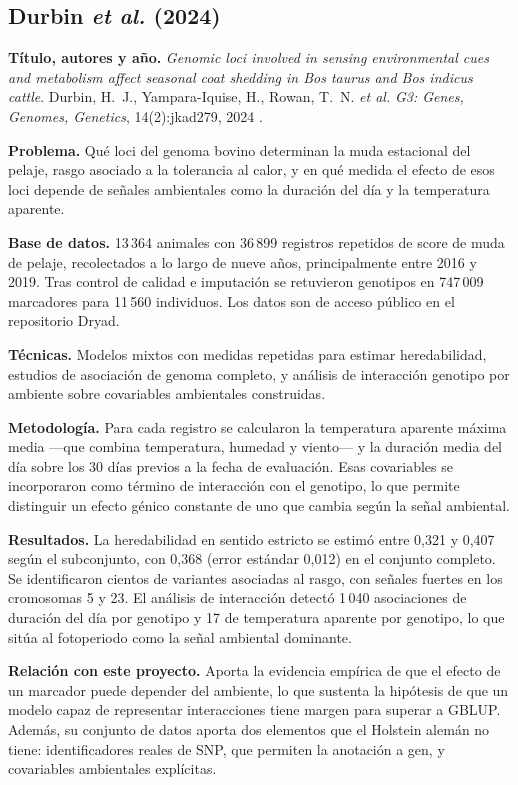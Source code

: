 \documentclass[conference]{IEEEtran}
\begin{document}
\subsection{Durbin \textit{et al.} (2024)}

\textbf{Título, autores y año.} \textit{Genomic loci involved in sensing
environmental cues and metabolism affect seasonal coat shedding in Bos
taurus and Bos indicus cattle}. Durbin, H.~J., Yampara-Iquise, H., Rowan,
T.~N. \textit{et al.} \textit{G3: Genes, Genomes, Genetics},
14(2):jkad279, 2024 \cite{durbin2024}.

\textbf{Problema.} Qué loci del genoma bovino determinan la muda
estacional del pelaje, rasgo asociado a la tolerancia al calor, y en qué
medida el efecto de esos loci depende de señales ambientales como la
duración del día y la temperatura aparente.

\textbf{Base de datos.} 13\,364 animales con 36\,899 registros repetidos
de score de muda de pelaje, recolectados a lo largo de nueve años,
principalmente entre 2016 y 2019. Tras control de calidad e imputación se
retuvieron genotipos en 747\,009 marcadores para 11\,560 individuos. Los
datos son de acceso público en el repositorio Dryad.

\textbf{Técnicas.} Modelos mixtos con medidas repetidas para estimar
heredabilidad, estudios de asociación de genoma completo, y análisis de
interacción genotipo por ambiente sobre covariables ambientales
construidas.

\textbf{Metodología.} Para cada registro se calcularon la temperatura
aparente máxima media —que combina temperatura, humedad y viento— y la
duración media del día sobre los 30 días previos a la fecha de
evaluación. Esas covariables se incorporaron como término de interacción
con el genotipo, lo que permite distinguir un efecto génico constante de
uno que cambia según la señal ambiental.

\textbf{Resultados.} La heredabilidad en sentido estricto se estimó entre
0{,}321 y 0{,}407 según el subconjunto, con 0{,}368 (error estándar
0{,}012) en el conjunto completo. Se identificaron cientos de variantes
asociadas al rasgo, con señales fuertes en los cromosomas 5 y 23. El
análisis de interacción detectó 1\,040 asociaciones de duración del día
por genotipo y 17 de temperatura aparente por genotipo, lo que sitúa al
fotoperiodo como la señal ambiental dominante.

\textbf{Relación con este proyecto.} Aporta la evidencia empírica de que
el efecto de un marcador puede depender del ambiente, lo que sustenta la
hipótesis de que un modelo capaz de representar interacciones tiene margen
para superar a GBLUP. Además, su conjunto de datos aporta dos elementos
que el Holstein alemán no tiene: identificadores reales de SNP, que
permiten la anotación a gen, y covariables ambientales explícitas.
\end{document}
